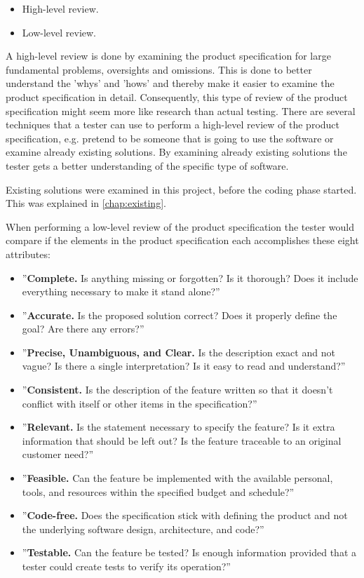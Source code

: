 \begin{itemize}
	\item High-level review.
	\item Low-level review.
\end{itemize}

A high-level review is done by examining the product specification for large fundamental problems, oversights and omissions.
This is done to better understand the 'whys' and 'hows' and thereby make it easier to examine the product specification in detail.
Consequently, this type of review of the product specification might seem more like research than actual testing.
There are several techniques that a tester can use to perform a high-level review of the product specification, e.g. pretend to be someone that is going to use the software or examine already existing solutions.
By examining already existing solutions the tester gets a better understanding of the specific type of software. \cite{SoftwareTesting}

Existing solutions were examined in this project, before the coding phase started.
This was explained in \cref{chap:existing}.

When performing a low-level review of the product specification the tester would compare if the elements in the product specification each accomplishes these eight attributes: \cite{SoftwareTesting}

\begin{itemize}
	\item ''\textbf{Complete.} Is anything missing or forgotten? Is it thorough? Does it include everything necessary to make it stand alone?''
	\item ''\textbf{Accurate.} Is the proposed solution correct? Does it properly define the goal? Are there any errors?''
	\item ''\textbf{Precise, Unambiguous, and Clear.} Is the description exact and not vague? Is there a single interpretation? Is it easy to read and understand?''
	\item ''\textbf{Consistent.} Is the description of the feature written so that it doesn't conflict with itself or other items in the specification?''
	\item ''\textbf{Relevant.} Is the statement necessary to specify the feature? Is it extra information that should be left out? Is the feature traceable to an original customer need?''
	\item ''\textbf{Feasible.} Can the feature be implemented with the available personal, tools, and resources within the specified budget and schedule?''
	\item ''\textbf{Code-free.} Does the specification stick with defining the product and not the underlying software design, architecture, and code?''
	\item ''\textbf{Testable.} Can the feature be tested? Is enough information provided that a tester could create tests to verify its operation?''
\end{itemize}

